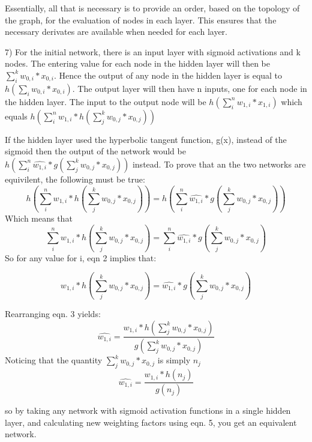 \documentclass[12pt]{article}
\begin{document}
Essentially, all that is necessary is to provide an order, based on the topology of the graph, for the evaluation of nodes in each layer. 
This ensures that the necessary derivates are available when needed for each layer. 

\pagebreak
\setcounter{equation}{0}
7) For the initial network, there is an input layer with sigmoid activations and k nodes. The entering value for each node in the 
hidden layer will then be $\sum_i^k w_{0,i}*x_{0,i}$. Hence the output of any node in the hidden layer is equal to 
$h(\sum_i w_{0,i}*x_{0,i})$. The output layer will then have n inputs, one for each node in the hidden layer. 
The input to the output node will be $h(\sum_i^n w_{1,i}*x_{1,i})$ which equals $h(\sum_i^n w_{1,i}*h(\sum_j^k w_{0,j}*x_{0,j}))$

If the hidden layer used the hyperbolic tangent function, g(x), instead of the sigmoid then the output of the network would be 
$h(\sum_i^n \hat{w_{1,i}}*g(\sum_j^k w_{0,j}*x_{0,j}))$ instead. To prove that an the two networks are equivilent, the following must be 
true: 
\begin{equation}
    h(\sum_i^n w_{1,i}*h(\sum_j^k w_{0,j}*x_{0,j})) = h(\sum_i^n \hat{w_{1,i}}*g(\sum_j^k w_{0,j}*x_{0,j}))
\end{equation}
Which means that 
\begin{equation}
    \sum_i^n w_{1,i}*h(\sum_j^k w_{0,j}*x_{0,j}) = \sum_i^n \hat{w_{1,i}}*g(\sum_j^k w_{0,j}*x_{0,j})
\end{equation}
So for any value for i, eqn 2 implies that: 

\begin{equation}
    w_{1,i}*h(\sum_j^k w_{0,j}*x_{0,j}) = \hat{w_{1,i}}*g(\sum_j^k w_{0,j}*x_{0,j})
\end{equation}

Rearranging eqn. 3 yields: 
\begin{equation}
     \hat{w_{1,i}} = \frac{w_{1,i}*h(\sum_j^k w_{0,j}*x_{0,j})}{g(\sum_j^k w_{0,j}*x_{0,j})}
\end{equation}
Noticing that the quantity $\sum_j^k w_{0,j}*x_{0,j}$ is simply $n_j$
\begin{equation}
     \hat{w_{1,i}} = \frac{w_{1,i}*h(n_j)}{g(n_j)}
\end{equation}

so by taking any network with sigmoid activation functions in a single hidden layer, and calculating new 
weighting factors using eqn. 5, you get an equivalent network. 
\end{document}
